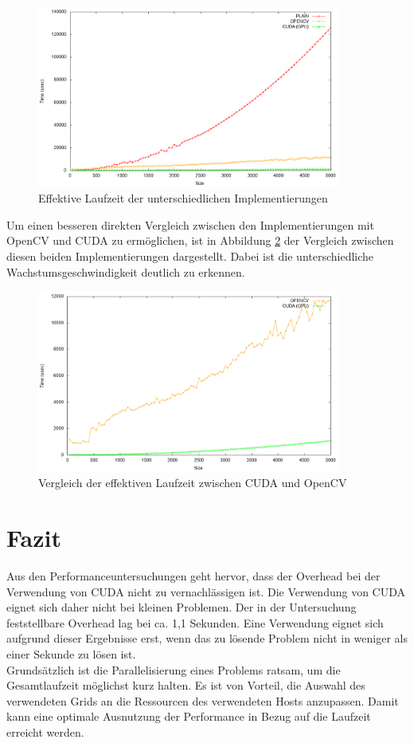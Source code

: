 \documentclass{llncs}
\begin{document}
\begin{figure}
	\centering
	\includegraphics[width=10cm,keepaspectratio]{analysis_gpu.png}
	\caption{Effektive Laufzeit der unterschiedlichen Implementierungen}
	\label{fig:analysis_gpu}
\end{figure}
\newpage
Um einen besseren direkten Vergleich zwischen den Implementierungen mit OpenCV und CUDA zu ermöglichen, ist in Abbildung \ref{fig:analysis_no_plain} der Vergleich zwischen diesen beiden Implementierungen dargestellt. Dabei ist die unterschiedliche Wachstumsgeschwindigkeit deutlich zu erkennen.

\begin{figure}
	\centering
	\includegraphics[width=10cm,keepaspectratio]{analysis_no_plain.png}
	\caption{Vergleich der effektiven Laufzeit zwischen CUDA und OpenCV}
	\label{fig:analysis_no_plain}
\end{figure}

%
\section{Fazit}
%

Aus den Performanceuntersuchungen geht hervor, dass der Overhead bei der Verwendung von CUDA nicht zu vernachlässigen ist. Die Verwendung von CUDA eignet sich daher nicht bei kleinen Problemen. Der in der Untersuchung feststellbare Overhead lag bei ca. 1,1 Sekunden. Eine Verwendung eignet sich aufgrund dieser Ergebnisse erst, wenn das zu lösende Problem nicht in weniger als einer Sekunde zu lösen ist.\\

Grundsätzlich ist die Parallelisierung eines Problems ratsam, um die Gesamtlaufzeit möglichst kurz halten.
Es ist von Vorteil, die Auswahl des verwendeten Grids an die Ressourcen des verwendeten Hosts anzupassen. Damit kann eine optimale Ausnutzung der Performance in Bezug auf die Laufzeit erreicht werden.
%
\end{document}
